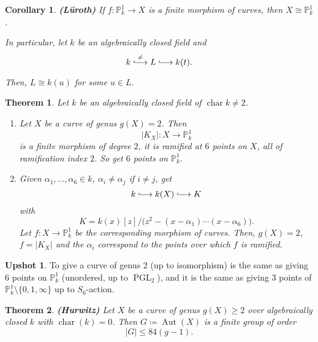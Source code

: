 \documentclass[12pt]{article}
\DeclareMathOperator{\PGL}{PGL}
\DeclareMathOperator{\chara}{char}
\DeclareMathOperator{\Aut}{Aut}
\newtheorem*{theorem}{Theorem}
\newtheorem*{corollary}{Corollary}
\theoremstyle{definition}
\newtheorem*{upshot}{Upshot}
\begin{document}
\begin{corollary}
\emph{\textbf{(L\"uroth)}} If $f:\mathbb P_k^1\rightarrow X$ is a finite morphism of curves, then $X\cong\mathbb P_k^1$.

In particular, let $k$ be an algebraically closed field and
\[k\overset\neq{\lhook\joinrel\longrightarrow}L\lhook\joinrel\longrightarrow k(t).\]

Then, $L\cong k(u)$ for some $u\in L$.
\end{corollary}

\begin{theorem}
Let $k$ be an algebraically closed field of $\chara k\neq2$.

\begin{enumerate}[label=\arabic*)]
\item Let $X$ be a curve of genus $g(X)=2$. Then
\[|K_X|:X\longrightarrow\mathbb P_k^1\]
is a finite morphism of degree $2$, it is ramified at $6$ points on $X$, all of ramification index $2$. So get $6$ points on $\mathbb P_k^1$.

\item Given $\alpha_1,\ldots,\alpha_6\in k$, $\alpha_i\neq\alpha_j$ if $i\neq j$, get
\[k\lhook\joinrel\longrightarrow k(X)\lhook\joinrel\longrightarrow K\]
with
\[K=k(x)[z]\big/\big(z^2-(x-\alpha_1)\cdots(x-\alpha_6)\big).\]
Let $f:X\rightarrow\mathbb P_k^1$ be the corresponding morphism of curves. Then, $g(X)=2$, $f=|K_X|$ and the $\alpha_i$ correspond to the points over which $f$ is ramified.
\end{enumerate}
\end{theorem}

\begin{upshot}
To give a curve of genus $2$ (up to isomorphism) is the same as giving $6$ points on $\mathbb P_k^1$ (unordered, up to $\PGL_2$), and it is the same as giving $3$ points of $\mathbb P_k^1\setminus\{0,1,\infty\}$ up to $S_6$-action.
\end{upshot}

\begin{theorem}
\emph{\textbf{(Hurwitz)}} Let $X$ be a curve of genus $g(X)\geq2$ over algebraically closed $k$ with $\chara(k)=0$. Then $G\coloneqq\Aut(X)$ is a finite group of order
\[|G|\leq84(g-1).\]
\end{theorem}
\end{document}
